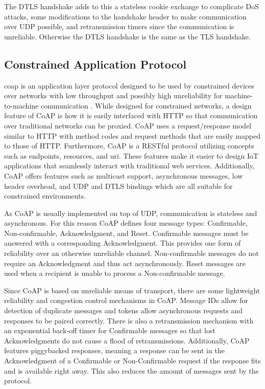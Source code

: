 \documentclass[0-thesis.tex]{subfiles}
\begin{document}
The DTLS handshake adds to this a stateless cookie exchange to complicate DoS attacks,
some modifications to the handshake header to make communication over UDP possible, and
retransmission timers since the communication is unreliable. Otherwise the DTLS handshake
is the same as the TLS handshake.

\subsection{Constrained Application Protocol}
\label{ssec:coap}
\acrfull{coap} is an application layer protocol designed to be used by constrained devices
over networks with low throughput and possibly high unreliability for machine-to-machine
communication \parencite{rfc7252}. While designed for constrained networks, a design
feature of CoAP is how it is easily interfaced with HTTP so that communication over
traditional networks can be proxied. CoAP uses a request/response model similar to HTTP
with method codes and request methods that are easily mapped to those of HTTP.
Furthermore, CoAP is a RESTful protocol utilizing concepts such as endpoints, resources,
and \gls{uri}. These features make it easier to design IoT applications that seamlessly
interact with traditional web services. Additionally, CoAP offers features such as
multicast support, asynchronous messages, low header overhead, and UDP and DTLS bindings
which are all suitable for constrained environments.

As CoAP is usually implemented on top of UDP, communication is stateless and asynchronous.
For this reason CoAP defines four message types: Confirmable, Non-confirmable,
Acknowledgment, and Reset. Confirmable messages must be answered with a corresponding
Acknowledgment. This provides one form of reliability over an otherwise unreliable
channel. Non-confirmable messages do not require an Acknowledgment and thus act
asynchronously. Reset messages are used when a recipient is unable to process a
Non-confirmable message.

Since CoAP is based on unreliable means of transport, there are some lightweight
reliability and congestion control mechanisms in CoAP. Message IDs allow for detection of
duplicate messages and tokens allow asynchronous requests and responses to be paired
correctly. There is also a retransmission mechanism with an exponential back-off timer for
Confirmable messages so that lost Acknowledgments do not cause a flood of retransmissions.
Additionally, CoAP features piggybacked responses, meaning a response can be sent in the
Acknowledgment of a Confirmable or Non-Confirmable request if the response fits and is
available right away. This also reduces the amount of messages sent by the protocol.
\end{document}
